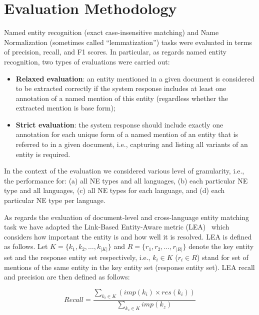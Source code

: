 \documentclass[11pt]{article}
\begin{document}
\section{Evaluation Methodology}
\label{sec:evaluation}

Named entity recognition (exact case-insensitive matching) and  Name Normalization (sometimes called “lemmatization”) tasks were evaluated in terms of precision, recall, and F1 scores. In particular, as regards named entity recognition, two types of evaluations were carried out:

\begin{itemize}

\item \textbf{Relaxed evaluation}: an entity mentioned in a given document is considered to be extracted correctly if the system response includes at least one annotation of a named mention of this entity (regardless whether the extracted mention is base form);

\item \textbf{Strict evaluation}: the system response should include exactly one annotation for each unique form of a named mention of an entity that is referred to in a given document, i.e., capturing and listing all variants of an entity is required.

\end{itemize}

In the context of the evaluation we considered various level of granularity, i.e., the performance for: 
(a) all NE types and all languages, (b) each particular NE type and all languages, (c) all NE types for 
each language, and (d) each particular NE type per language. 

As regards the evaluation of document-level and cross-language entity matching task we have adapted the 
Link-Based Entity-Aware metric (LEA)~\cite{DBLP:conf-acl-Moosavi016} which considers how important the entity is and how well it is resolved. LEA is defined as follows. Let $K = \{k_1,k_2,\ldots,k_{|K|} \}$ and $R = \{r_1,r_2,\ldots,r_{|R|} \}$ denote the key entity set and the response entity set respectively, i.e., $k_i \in K$ ($r_i \in R$) stand for set of mentions
of the same entity in the key entity set (response entity set). LEA recall and precision are then defined as follows:

\begin{equation*}
Recall = \frac{\sum_{k_{i} \in K} (imp(k_i) \times res(k_{i}))}
              {\sum_{k_{z} \in K} imp(k_{z})}
\end{equation*}
\end{document}

